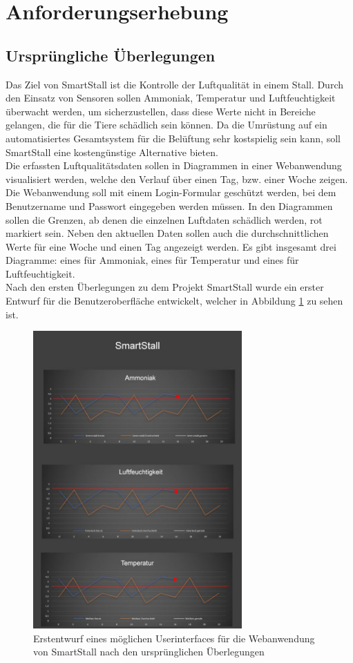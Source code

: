 \documentclass[conference]{IEEEtran}
\begin{document}
\section{Anforderungserhebung}
\subsection{Ursprüngliche Überlegungen}
Das Ziel von SmartStall ist die Kontrolle der Luftqualität in einem Stall. Durch den Einsatz von Sensoren sollen Ammoniak, Temperatur und Luftfeuchtigkeit überwacht werden, um sicherzustellen, dass diese Werte nicht in Bereiche gelangen, die für die Tiere schädlich sein können. Da die Umrüstung auf ein automatisiertes Gesamtsystem für die Belüftung sehr kostspielig sein kann, soll SmartStall eine kostengünstige Alternative bieten. \\
Die erfassten Luftqualitätsdaten sollen in Diagrammen in einer Webanwendung visualisiert werden, welche den Verlauf über einen Tag, bzw. einer Woche zeigen. Die Webanwendung soll mit einem Login-Formular geschützt werden, bei dem Benutzername und Passwort eingegeben werden müssen. In den Diagrammen sollen die Grenzen, ab denen die einzelnen Luftdaten schädlich werden, rot markiert sein. Neben den aktuellen Daten sollen auch die durchschnittlichen Werte für eine Woche und einen Tag angezeigt werden. Es gibt insgesamt drei Diagramme: eines für Ammoniak, eines für Temperatur und eines für Luftfeuchtigkeit. \\
Nach den ersten Überlegungen zu dem Projekt SmartStall wurde ein erster Entwurf für die Benutzeroberfläche entwickelt, welcher in Abbildung \ref{firstUI} zu sehen ist.
\begin{figure}[H]
	\centering
	\includegraphics[width=80mm]{fig/firstUI.JPG}
	\caption{Erstentwurf eines möglichen Userinterfaces für die Webanwendung von SmartStall nach den ursprünglichen Überlegungen}
	\label{firstUI}
\end{figure}
\end{document}
